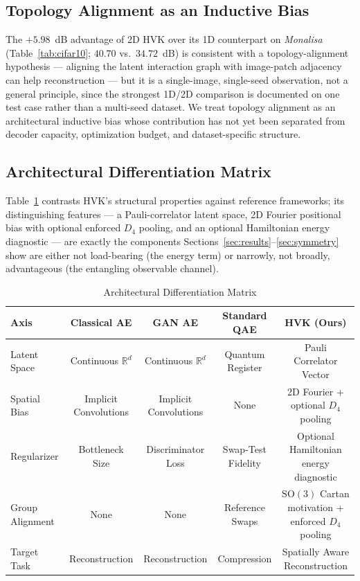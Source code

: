 \documentclass[journal]{IEEEtran}
\begin{document}
\subsection{Topology Alignment as an Inductive Bias}
The $+5.98$~dB advantage of 2D HVK over its 1D counterpart on \textit{Monalisa} (Table~\ref{tab:cifar10}; $40.70$ vs.\ $34.72$~dB) is consistent with a topology-alignment hypothesis --- aligning the latent interaction graph with image-patch adjacency can help reconstruction --- but it is a single-image, single-seed observation, not a general principle, since the strongest 1D/2D comparison is documented on one test case rather than a multi-seed dataset. We treat topology alignment as an architectural inductive bias whose contribution has not yet been separated from decoder capacity, optimization budget, and dataset-specific structure.

\subsection{Architectural Differentiation Matrix}
Table~\ref{tab:differentiation} contrasts HVK's structural properties against reference frameworks; its distinguishing features --- a Pauli-correlator latent space, 2D Fourier positional bias with optional enforced $D_4$ pooling, and an optional Hamiltonian energy diagnostic --- are exactly the components Sections~\ref{sec:results}--\ref{sec:symmetry} show are either not load-bearing (the energy term) or narrowly, not broadly, advantageous (the entangling observable channel).

\begin{table}[t]
\centering
\caption{Architectural Differentiation Matrix}
\label{tab:differentiation}
\begin{tabular}{lcccc}
\toprule
Axis & Classical AE \cite{Slabbert2024} & GAN AE & Standard QAE \cite{Zhai2025} & HVK (Ours) \\
\midrule
Latent Space & Continuous $\mathbb{R}^d$ & Continuous $\mathbb{R}^d$ & Quantum Register & Pauli Correlator Vector \\
Spatial Bias & Implicit Convolutions & Implicit Convolutions & None & 2D Fourier + optional $D_4$ pooling \\
Regularizer & Bottleneck Size & Discriminator Loss & Swap-Test Fidelity & Optional Hamiltonian energy diagnostic \\
Group Alignment & None & None & Reference Swaps & $\text{SO}(3)$ Cartan motivation + enforced $D_4$ pooling \\
Target Task & Reconstruction & Reconstruction & Compression & Spatially Aware Reconstruction \\
\bottomrule
\end{tabular}
\end{table}
\end{document}

